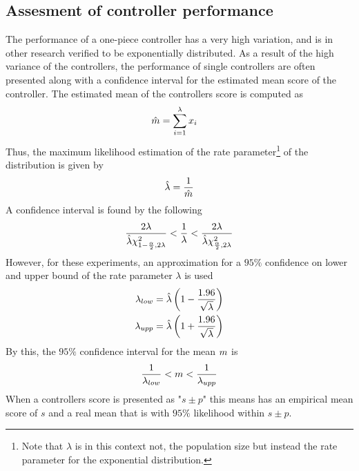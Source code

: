 \subsection{Assesment of controller performance \label{sec:confidenceIntervals}}
The performance of a one-piece controller has a very high variation,
and is in other research verified to be exponentially distributed.
As a result of the high variance of the controllers, the performance 
of single controllers are often presented along with a confidence interval
for the estimated mean score of the controller. The estimated mean of 
the controllers score is computed as
\begin{align}
\hat{m} &= \sum_{i=1}^{\lambda} x_i
\end{align}
Thus, the maximum likelihood estimation of the rate 
parameter\footnote{Note that $\lambda$ is in this context not,
the population size but instead the rate parameter for the
exponential distribution.}
of the distribution is given by
\begin{align}
\hat{\lambda} = \frac{1}{\hat{m}}
\end{align}
A confidence interval is found by the following
\begin{align}
\frac{2\lambda}{\hat{\lambda}\chi^{2}_{1-\frac{\alpha}{2},2\lambda}}
<
\frac{1}{\lambda}
< 
\frac{2\lambda}{\hat{\lambda}\chi^{2}_{\frac{\alpha}{2},2\lambda}}
\end{align}
However, for these experiments, an approximation for a $95\%$
confidence on lower and upper bound 
of the rate parameter $\lambda$ is used
\begin{align}
\lambda_{low} &= 
\hat{\lambda} \left( 1 - \frac{1.96}{\sqrt{\lambda}} \right)\\
\lambda_{upp} &= 
\hat{\lambda} \left( 1 + \frac{1.96}{\sqrt{\lambda}} \right)
\end{align}
By this, the $95\%$ confidence interval for the mean $m$ is
\begin{align}
\frac{1}{\lambda_{low}} < m < \frac{1}{\lambda_{upp}}
\end{align}
When a controllers score is presented as "$s \pm p$" this means 
has an empirical mean score of $s$ and a real mean that is with 
$95\%$ likelihood within $s \pm p$. \\
